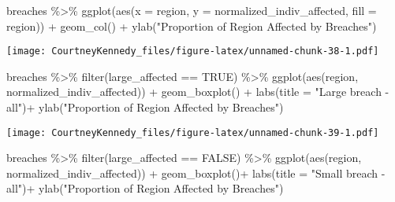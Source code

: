\documentclass[
]{article}
\newenvironment{Shaded}{\begin{snugshade}}{\end{snugshade}}
\newcommand{\AttributeTok}[1]{\textcolor[rgb]{0.77,0.63,0.00}{#1}}
\newcommand{\ConstantTok}[1]{\textcolor[rgb]{0.00,0.00,0.00}{#1}}
\newcommand{\FunctionTok}[1]{\textcolor[rgb]{0.00,0.00,0.00}{#1}}
\newcommand{\NormalTok}[1]{#1}
\newcommand{\SpecialCharTok}[1]{\textcolor[rgb]{0.00,0.00,0.00}{#1}}
\newcommand{\StringTok}[1]{\textcolor[rgb]{0.31,0.60,0.02}{#1}}
\begin{document}
\begin{Shaded}
\begin{Highlighting}[]
\NormalTok{breaches }\SpecialCharTok{\%\textgreater{}\%}
  \FunctionTok{ggplot}\NormalTok{(}\FunctionTok{aes}\NormalTok{(}\AttributeTok{x =}\NormalTok{ region, }\AttributeTok{y =}\NormalTok{ normalized\_indiv\_affected, }\AttributeTok{fill =}\NormalTok{ region)) }\SpecialCharTok{+}
  \FunctionTok{geom\_col}\NormalTok{() }\SpecialCharTok{+}
  \FunctionTok{ylab}\NormalTok{(}\StringTok{"Proportion of Region Affected by Breaches"}\NormalTok{)}
\end{Highlighting}
\end{Shaded}

\texttt{[image: CourtneyKennedy\_files/figure-latex/unnamed-chunk-38-1.pdf]}

\begin{Shaded}
\begin{Highlighting}[]
\NormalTok{breaches }\SpecialCharTok{\%\textgreater{}\%}
  \FunctionTok{filter}\NormalTok{(large\_affected }\SpecialCharTok{==} \ConstantTok{TRUE}\NormalTok{) }\SpecialCharTok{\%\textgreater{}\%}
  \FunctionTok{ggplot}\NormalTok{(}\FunctionTok{aes}\NormalTok{(region, normalized\_indiv\_affected)) }\SpecialCharTok{+}
  \FunctionTok{geom\_boxplot}\NormalTok{() }\SpecialCharTok{+}
  \FunctionTok{labs}\NormalTok{(}\AttributeTok{title =} \StringTok{"Large breach {-}all"}\NormalTok{)}\SpecialCharTok{+}
  \FunctionTok{ylab}\NormalTok{(}\StringTok{"Proportion of Region Affected by Breaches"}\NormalTok{)}
\end{Highlighting}
\end{Shaded}

\texttt{[image: CourtneyKennedy\_files/figure-latex/unnamed-chunk-39-1.pdf]}

\begin{Shaded}
\begin{Highlighting}[]
\NormalTok{breaches }\SpecialCharTok{\%\textgreater{}\%}
  \FunctionTok{filter}\NormalTok{(large\_affected }\SpecialCharTok{==} \ConstantTok{FALSE}\NormalTok{) }\SpecialCharTok{\%\textgreater{}\%}
  \FunctionTok{ggplot}\NormalTok{(}\FunctionTok{aes}\NormalTok{(region, normalized\_indiv\_affected)) }\SpecialCharTok{+}
  \FunctionTok{geom\_boxplot}\NormalTok{()}\SpecialCharTok{+}
  \FunctionTok{labs}\NormalTok{(}\AttributeTok{title =} \StringTok{"Small breach {-}all"}\NormalTok{)}\SpecialCharTok{+}
  \FunctionTok{ylab}\NormalTok{(}\StringTok{"Proportion of Region Affected by Breaches"}\NormalTok{)}
\end{Highlighting}
\end{Shaded}
\end{document}

